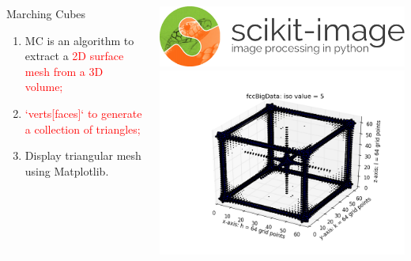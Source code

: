 \documentclass[]{beamer}
\begin{document}
\begin{frame}
\begin{columns}
\begin{column}{0.65\textwidth}
            \begin{block}{Marching Cubes}%
                \begin{enumerate}
                \item \scriptsize MC is an algorithm to extract a \textcolor{red}{2D surface mesh from a 3D volume;} 
                \item \scriptsize \textcolor{red}{`verts[faces]` to generate a collection of triangles;}
                \item \scriptsize Display triangular mesh using Matplotlib.
                \end{enumerate}
            \end{block}
    \end{column}
    \begin{column}{0.35\textwidth}
        \includegraphics[width=1.2\textwidth]{pics/logo_scikit.png}\\
        \includegraphics[width=1.58\textwidth]{pics/fccBigData_isosurf64.png}
    \end{column}
    \hspace*{1.3cm}
    \end{columns}      

\end{frame}
\end{document}
